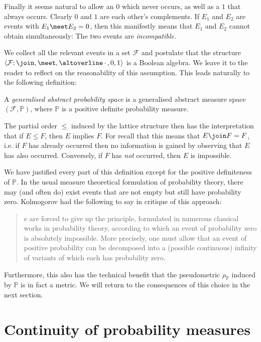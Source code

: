 \documentclass[article, a4paper, 11pt, oneside]{memoir}
\numberwithin{equation}{chapter}
\newcommand{\calF}{\mathcal{F}}
\renewcommand{\P}{\mathbb{P}}
\begin{document}
Finally it seems natural to allow an  $0$ which never occurs, as well as a  $1$ that always occurs. Clearly $0$ and $1$ are each other's complements. If $E_1$ and $E_2$ are events with $E_1 \meet E_2 = 0$, then this manifestly means that $E_1$ and $E_2$ cannot obtain simultaneously: The two events are \emph{incompatible}.

We collect all the relevant events in a set $\calF$ and postulate that the structure $\langle \calF; \join, \meet, \compl{\,\cdot\,\vphantom{e}}, 0, 1 \rangle$ is a Boolean algebra. We leave it to the reader to reflect on the reasonability of this assumption. This leads naturally to the following definition:

\begin{definition}
    A \emph{generalised abstract probability space} is a generalised abstract measure space $(\calF, \P)$, where $\P$ is a positive definite probability measure.
\end{definition}
%
The partial order $\leq$ induced by the lattice structure then has the interpretation that if $E \leq F$, then $E$ implies $F$. For recall that this means that $E \join F = F$, i.e. if $F$ has already occurred then no information is gained by observing that $E$ has also occurred. Conversely, if $F$ has \emph{not} occurred, then $E$ is impossible.

We have justified every part of this definition except for the positive definiteness of $\P$. In the usual measure theoretical formulation of probability theory, there may (and often do) exist events that are not empty but still have probability zero. Kolmogorov had the following to say in critique of this approach:
%
\blockquote[\cite{kolmogorov1995}]{%
    e are forced to give up the principle, formulated in numerous classical works in probability theory, according to which an event of probability zero is absolutely impossible. More precisely, one must allow that an event of positive probability can be decomposed into a (possible continuous) infinity of variants of which each has probability
    zero.%
}
%
Furthermore, this also has the technical benefit that the pseudometric $\rho_\P$ induced by $\P$ is in fact a metric. We will return to the consequences of this choice in the next section.


\section{Continuity of probability measures}
\end{document}
